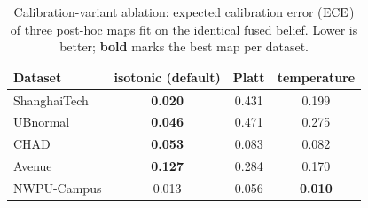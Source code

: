 \begin{table}[t]
\centering
\caption{Calibration-variant ablation: expected calibration error ($\mathrm{ECE}$)
of three post-hoc maps fit on the identical fused belief. Lower is better;
\textbf{bold} marks the best map per dataset.}
\label{tab:ablationcalib}
\setlength{\tabcolsep}{5pt}
\renewcommand{\arraystretch}{1.15}
\footnotesize
\begin{tabular}{@{}lccc@{}}
\toprule
Dataset & isotonic (default) & Platt & temperature \\
\midrule
ShanghaiTech & \textbf{0.020} & 0.431 & 0.199 \\
UBnormal     & \textbf{0.046} & 0.471 & 0.275 \\
CHAD         & \textbf{0.053} & 0.083 & 0.082 \\
Avenue       & \textbf{0.127} & 0.284 & 0.170 \\
NWPU-Campus  & 0.013 & 0.056 & \textbf{0.010} \\
\bottomrule
\end{tabular}
\end{table}
